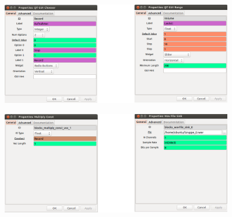 \documentclass[12pt,a4paper]{article}
\begin{document}
\begin{figure}[hbt!]
\centering
	\includegraphics[width=0.9\textwidth ]
	{Bilder/Aufgabe1-properties4.png}
	\label{fig:Label6}
\end{figure}
\clearpage


\begin{figure}[hbt!]
\centering
	\includegraphics[width=0.9\textwidth ]
	{Bilder/Aufgabe1-properties5.png}
	\label{fig:Label7}
\end{figure}


\newpage
\end{document}
